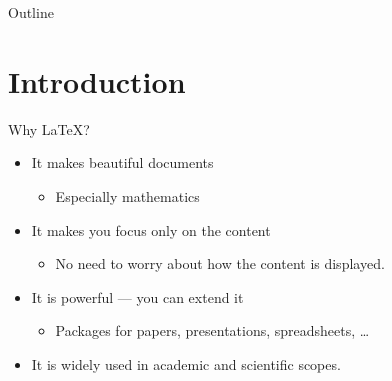 \documentclass{beamer}
\begin{document}
\begin{frame}
\titlepage
\end{frame}

\begin{frame}{Outline}
\tableofcontents
\end{frame}


\section{Introduction}
\begin{frame}{Why \LaTeX{}?}
\begin{itemize}
\item It makes beautiful documents
\begin{itemize}
\item Especially mathematics
\end{itemize}
%
\item It makes you focus only on the content
\begin{itemize}
\item No need to worry about how the content is displayed.
\end{itemize}
%
\item It is powerful --- you can extend it
\begin{itemize}
\item Packages for papers, presentations, spreadsheets, \ldots
\end{itemize}
\item It is widely used in academic and scientific scopes.
\end{itemize}
\end{frame}
\end{document}
